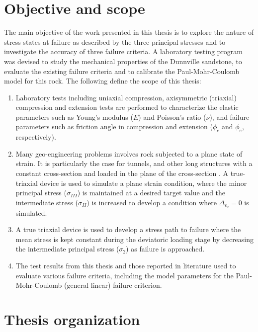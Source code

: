 \section{Objective and scope}

The main objective of the work presented in this thesis is to explore the nature of stress states at failure as described by the three principal stresses and to investigate the accuracy of three failure criteria. A laboratory testing program was devised to study the mechanical properties of the Dunnville sandstone, to evaluate the existing failure criteria and to calibrate the Paul-Mohr-Coulomb model for this rock. The following define the scope of this thesis:

\begin{enumerate}
    \item Laboratory tests including uniaxial compression, axisymmetric (triaxial) compression and extension tests are performed to characterize the elastic parameters such as Young's modulus ($E$) and Poisson’s ratio ($\nu$), and failure parameters such as friction angle in compression and extension ($\phi_c$ and $\phi_e$, respectively).

    \item Many geo-engineering problems involves rock subjected to a plane state of strain. It is particularly the case for tunnels, and other long structures with a constant cross-section and loaded in the plane of the cross-section \cite{Jaeger1979}. A true-triaxial device is used to simulate a plane strain condition, where the minor principal stress ($\sigma_{III}$) is maintained at a desired target value and the intermediate stress ($\sigma_{II}$) is increased to develop a condition where $\Delta_{\epsilon_2}=0$ is simulated.

    \item A true triaxial device is used to develop a stress path to failure where the mean stress is kept constant during the deviatoric loading stage by decreasing the intermediate principal stress ($\sigma_2$) as failure is approached.

    \item The test results from this thesis and those reported in literature used to evaluate various failure criteria, including the model parameters for the Paul-Mohr-Coulomb (general linear) failure criterion.
\end{enumerate}

\section{Thesis organization}

